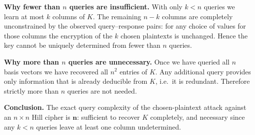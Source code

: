 \documentclass[]{scrartcl}
\newcounter{exercise}
\newcommand{\exname}{}
\begin{document}
\medskip
\textbf{Why fewer than $n$ queries are insufficient.}
With only $k < n$ queries we learn at most $k$ columns of $K$. The remaining $n-k$ columns are completely unconstrained by the observed query--response pairs: for any choice of values for those columns the encryption of the $k$ chosen plaintexts is unchanged. Hence the key cannot be uniquely determined from fewer than $n$ queries.

\medskip
\textbf{Why more than $n$ queries are unnecessary.}
Once we have queried all $n$ basis vectors we have recovered all $n^2$ entries of $K$. Any additional query provides only information that is already deducible from $K$, i.e.\ it is redundant. Therefore strictly more than $n$ queries are not needed.

\medskip
\textbf{Conclusion.} The exact query complexity of the chosen-plaintext attack against an $n\times n$ Hill cipher is $\mathbf{n}$: sufficient to recover $K$ completely, and necessary since any $k<n$ queries leave at least one column undetermined.


\pagebreak
{}
\renewcommand{\exname}{Vigen\`ere Cipher}
\end{document}
